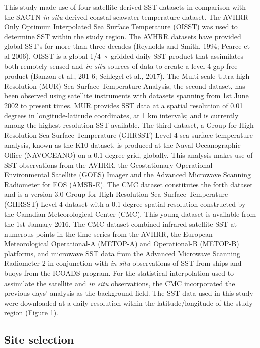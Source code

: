 \documentclass[12pt,]{article}
\begin{document}
This study made use of four satellite derived SST datasets in comparison
with the SACTN \emph{in situ} derived coastal seawater temperature
dataset. The AVHRR- Only Optimum Interpolated Sea Surface Temperature
(OISST) was used to determine SST within the study region. The AVHRR
datasets have provided global SST's for more than three decades
(Reynolds and Smith, 1994; Pearce et al 2006). OISST is a global 1/4 ◦
gridded daily SST product that assimilates both remotely sensed and
\emph{in situ} sources of data to create a level-4 gap free product
(Banzon et al., 201 6; Schlegel et al., 2017). The Multi-scale
Ultra-high Resolution (MUR) Sea Surface Temperature Analysis, the second
dataset, has been observed using satellite instruments with datasets
spanning from 1st June 2002 to present times. MUR provides SST data at a
spatial resolution of 0.01 degrees in longitude-latitude coordinates, at
1 km intervals; and is currently among the highest resolution SST
available. The third dataset, a Group for High Resolution Sea Surface
Temperature (GHRSST) Level 4 sea surface temperature analysis, known as
the K10 dataset, is produced at the Naval Oceanographic Office
(NAVOCEANO) on a 0.1 degree grid, globally. This analysis makes use of
SST observations from the AVHRR, the Geostationary Operational
Environmental Satellite (GOES) Imager and the Advanced Microwave
Scanning Radiometer for EOS (AMSR-E). The CMC dataset constitutes the
forth dataset and is a version 3.0 Group for High Resolution Sea Surface
Temperature (GHRSST) Level 4 dataset with a 0.1 degree spatial
resolution constructed by the Canadian Meteorological Center (CMC). This
young dataset is available from the 1st January 2016. The CMC dataset
combined infrared satellite SST at numerous points in the time series
from the AVHRR, the European Meteorological Operational-A (METOP-A) and
Operational-B (METOP-B) platforms, and microwave SST data from the
Advanced Microwave Scanning Radiometer 2 in conjunction with \emph{in
situ} observations of SST from ships and buoys from the ICOADS program.
For the statistical interpolation used to assimilate the satellite and
\emph{in situ} observations, the CMC incorporated the previous days'
analysis as the background field. The SST data used in this study were
downloaded at a daily resolution within the latitude/longitude of the
study region (Figure 1).

\subsection{Site selection}\label{site-selection}
\end{document}
